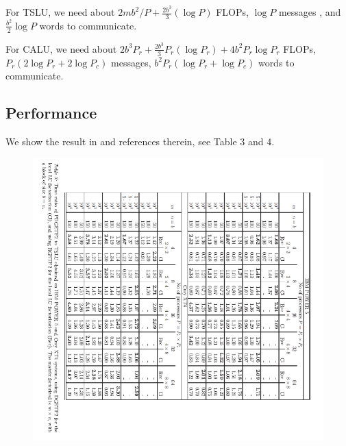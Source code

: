 \documentclass{article}
\begin{document}
For TSLU, we need about $2mb^2/P + \frac{2b^3}{3}(\log P)$ FLOPs, $\log P$ messages , and $\frac{b^2}{2} \log P$ words to communicate.

For CALU, we need about $2b^3P_r + \frac{2b^3}{3}P_r(\log P_r) + 4b^2 P_r \log P_r$ FLOPs,$P_r(2\log P_r + 2\log P_c)$ messages, $b^2P_r(\log P_r + \log P_c)$ words to communicate.
\subsection{Performance}
We show the result in \cite{grigori_calu_2011}
and references therein, see Table 3 and 4.

\begin{figure}[htbp]
	\centering
	\includegraphics[scale=.6]{TSLU_res.png}
\end{figure}
\end{document}
